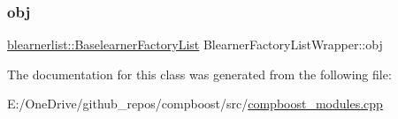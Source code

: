\mbox{\label{class_blearner_factory_list_wrapper_a3c9f95887bc2c583c120d01efc2e69b2}} 
\subsubsection{\texorpdfstring{obj}{obj}}
{\footnotesize\ttfamily \mbox{\hyperlink{classblearnerlist_1_1_baselearner_factory_list}{blearnerlist\+::\+Baselearner\+Factory\+List}} Blearner\+Factory\+List\+Wrapper\+::obj\hspace{0.3cm}{\ttfamily [private]}}



The documentation for this class was generated from the following file\+:\begin{DoxyCompactItemize}
\item 
E\+:/\+One\+Drive/github\+\_\+repos/compboost/src/\mbox{\hyperlink{compboost__modules_8cpp}{compboost\+\_\+modules.\+cpp}}\end{DoxyCompactItemize}
